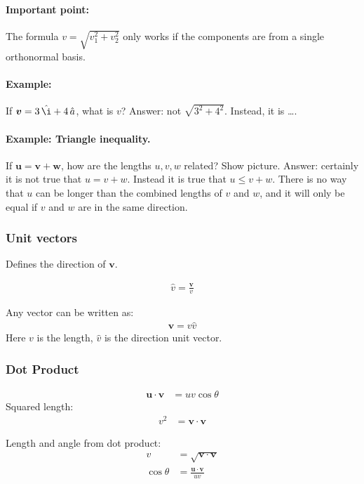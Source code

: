\documentclass{article}
\renewcommand{\vec}[1]{\boldsymbol{#1}}
\newcommand{\unit}[1]{\,\hat{#1}}
\begin{document}
\paragraph{Important point:} The formula $v = \sqrt{v_1^2 + v_2^2}$
only works if the components are from a single orthonormal basis.

\paragraph{Example:} If $\vec{v} = 3\unit{\i} + 4\unit{a}$, what is $v$?
Answer: not $\sqrt{3^2 + 4^2}$. Instead, it is \ldots.

\paragraph{Example: Triangle inequality.} If $\vec{u} = \vec{v} +
\vec{w}$, how are the lengths $u, v, w$ related? Show picture. Answer:
certainly it is not true that $u = v + w$. Instead it is true that $u
\le v + w$. There is no way that $u$ can be longer than the combined
lengths of $v$ and $w$, and it will only be equal if $v$ and $w$ are
in the same direction.

\subsubsection{Unit vectors}

Defines the direction of $\vec{v}$.

\begin{align}
  \hat{v} = \frac{\vec{v}}{v}
\end{align}

Any vector can be written as:
\begin{align}
  \vec{v} = v \hat{v}
\end{align}
Here $v$ is the length, $\hat{v}$ is the direction unit vector.

\subsubsection{Dot Product}

\begin{align}
  \vec{u} \cdot \vec{v} &= u v \cos\theta
\end{align}
Squared length:
\begin{align}
  v^2 &= \vec{v} \cdot \vec{v}
\end{align}

Length and angle from dot product:
\begin{align}
  v &= \sqrt{\vec{v} \cdot \vec{v}} \\
  \cos\theta &= \frac{\vec{u} \cdot \vec{v}}{u v}
\end{align}
\end{document}
